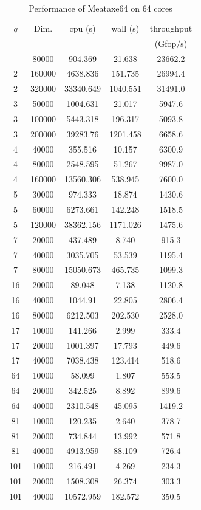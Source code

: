 \documentclass{deliverablereport}
\begin{document}
\begin{small}
\begin{center}
  \begin{longtable}{|c|c|c|c|c|}
    \caption[]{Performance of Meataxe64 on 64 cores}\label{fig:matmult:par}\\
    \hline
    $q$&Dim.&cpu (s)&wall (s) &throughput\\
    &&&&(Gfop/s)\\
    \hline
    \endhead
    \hline
    \endfoot
2&80000&904.369&21.638&23662.2\\
2&160000&4638.836&151.735&26994.4\\
2&320000&33340.649&1040.551&31491.0\\
3&50000&1004.631&21.017&5947.6\\
3&100000&5443.318&196.317&5093.8\\
3&200000&39283.76&1201.458&6658.6\\
4&40000&355.516&10.157&6300.9\\
4&80000&2548.595&51.267&9987.0\\
4&160000&13560.306&538.945&7600.0\\
5&30000&974.333&18.874&1430.6\\
5&60000&6273.661&142.248&1518.5\\
5&120000&38362.156&1171.026&1475.6\\
7&20000&437.489&8.740&915.3\\
7&40000&3035.705&53.539&1195.4\\
7&80000&15050.673&465.735&1099.3\\
16&20000&89.048&7.138&1120.8\\
16&40000&1044.91&22.805&2806.4\\
16&80000&6212.503&202.530&2528.0\\
17&10000&141.266&2.999&333.4\\
17&20000&1001.397&17.793&449.6\\
17&40000&7038.438&123.414&518.6\\
64&10000&58.099&1.807&553.5\\
64&20000&342.525&8.892&899.6\\
64&40000&2310.548&45.095&1419.2\\
81&10000&120.235&2.640&378.7\\
81&20000&734.844&13.992&571.8\\
81&40000&4913.959&88.109&726.4\\
101&10000&216.491&4.269&234.3\\
101&20000&1508.308&26.374&303.3\\
101&40000&10572.959&182.572&350.5\\
  \end{longtable}
\end{center}
\end{small}
\end{document}
